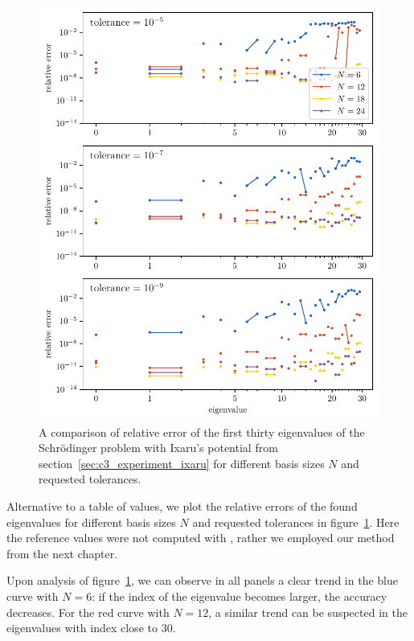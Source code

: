 \begin{figure}
  \begin{center}
    \includegraphics[width=\textwidth]{img/chapter3/experiments/ixaru_lobatto.pdf}
  \end{center}
  \caption{A comparison of relative error of the first thirty eigenvalues of the Schrödinger problem with Ixaru's potential from section~\ref{sec:c3_experiment_ixaru} for different basis sizes $N$ and requested tolerances.}\label{fig:c3_experiment_ixaru}
\end{figure}

Alternative to a table of values, we plot the relative errors of the found eigenvalues for different basis sizes $N$ and requested tolerances in figure~\ref{fig:c3_experiment_ixaru}. Here the reference values were not computed with \pyslisetd{}, rather we employed our method from the next chapter. 

Upon analysis of figure~\ref{fig:c3_experiment_ixaru}, we can observe in all panels a clear trend in the blue curve with $N = 6$: if the index of the eigenvalue becomes larger, the accuracy decreases. For the red curve with $N = 12$,  a similar trend can be suspected in the eigenvalues with index close to $30$.


